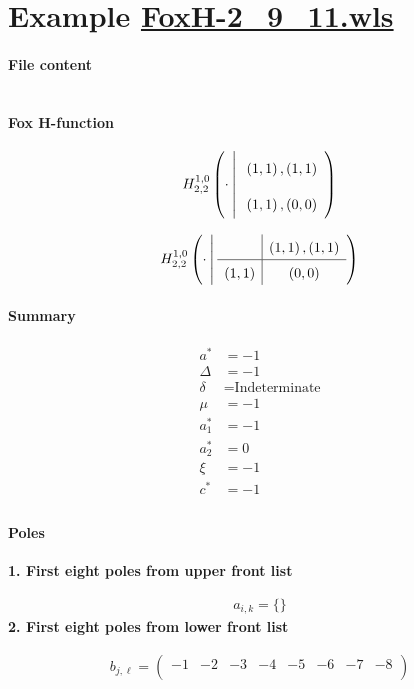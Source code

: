 \documentclass[11pt]{article}
\begin{document}
\section{Example \url{FoxH-2_9_11.wls}}

\paragraph{File content}

\inputminted{text}{FoxH-2_9_11.wls}

\paragraph{Fox H-function}

\begin{align*}
  \FoxH
    {1,0}
    {2,2}
    {\cdot}
    {\left(1, 1\right), \left(1, 1\right)}
    {\left(1, 1\right), \left(0, 0\right)}
\end{align*}

\begin{align*}
  \FoxHext
    {1,0}
    {2,2}
    {\cdot}
    {}
    {\left(1, 1\right), \left(1, 1\right)}
    {\left(1, 1\right)}
    {\left(0, 0\right)}
\end{align*}

\paragraph{Summary}

\begin{align*}
  a^*    & = -1 \\
  \Delta & = -1 \\
  \delta & = \text{Indeterminate} \\
  \mu    & = -1 \\
  a_1^*  & = -1 \\
  a_2^*  & = 0 \\
  \xi    & = -1 \\
  c^*    & = -1 \\
\end{align*}

\paragraph{Poles}

\noindent\textbf{1. First eight poles from upper front list}

\begin{align*}
  a_{i,k} = 
  \{\}
\end{align*}
\noindent\textbf{2. First eight poles from lower front list}

\begin{align*}
  b_{j,\ell} = 
  \left(
\begin{array}{cccccccc}
 -1 & -2 & -3 & -4 & -5 & -6 & -7 & -8 \\
\end{array}
\right)
\end{align*}

\printbibliography[title={References}]
\end{document}
